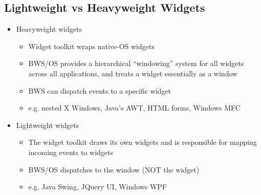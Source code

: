 \documentclass[twoside]{article}
\begin{document}
\subsection{Lightweight vs Heavyweight Widgets}
\begin{itemize}
\item Heavyweight widgets
\begin{itemize}
\item Widget toolkit wraps native-OS widgets
\item BWS/OS provides a hierarchical “windowing” system for all
widgets across all applications, and treats a widget essentially as a window
\item BWS can dispatch events to a specific widget
\item e.g. nested X Windows, Java’s AWT, HTML forms, Windows MFC
\end{itemize}
\item Lightweight widgets
\begin{itemize}
\item The widget toolkit draws its own widgets and is responsible for
mapping incoming events to widgets
\item BWS/OS dispatches to the window (NOT the widget) 
\item e.g. Java Swing, JQuery UI, Windows WPF
\end{itemize}
\end{itemize}
\end{document}
